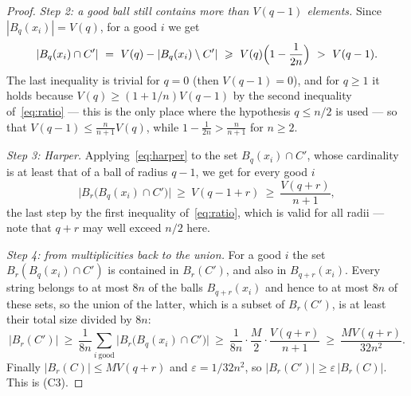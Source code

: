 \documentclass[10pt,a4paper]{amsart}
\newcommand{\eps}{\varepsilon}
\renewcommand{\ge}{\geqslant}
\renewcommand{\le}{\leqslant}
\begin{document}
\begin{proof}
\emph{Step 2: a good ball still contains more than $V(q-1)$ elements.} Since
$|B_q(x_i)|=V(q)$, for a good $i$ we get
\[
  |B_q(x_i)\cap C'|\ =\ V(q)-|B_q(x_i)\setminus C'|\ \ge\
  V(q)\Bigl(1-\frac1{2n}\Bigr)\ >\ V(q-1) .
\]
The last inequality is trivial for $q=0$ (then $V(q-1)=0$), and for $q\ge1$ it
holds because $V(q)\ge(1+1/n)V(q-1)$ by the second inequality
of~\eqref{eq:ratio} --- this is the only place where the hypothesis $q\le n/2$
is used --- so that $V(q-1)\le\frac n{n+1}V(q)$, while
$1-\frac1{2n}>\frac n{n+1}$ for $n\ge2$.

\emph{Step 3: Harper.} Applying~\eqref{eq:harper} to the set
$B_q(x_i)\cap C'$, whose cardinality is at least that of a ball of radius
$q-1$, we get for every good $i$
\[
  \bigl|B_r\bigl(B_q(x_i)\cap C'\bigr)\bigr|\ \ge\ V(q-1+r)\ \ge\
  \frac{V(q+r)}{n+1},
\]
the last step by the first inequality of~\eqref{eq:ratio}, which is valid for
all radii --- note that $q+r$ may well exceed $n/2$ here.

\emph{Step 4: from multiplicities back to the union.} For a good $i$ the set
$B_r(B_q(x_i)\cap C')$ is contained in $B_r(C')$, and also in $B_{q+r}(x_i)$.
Every string belongs to at most $8n$ of the balls $B_{q+r}(x_i)$ and hence to
at most $8n$ of these sets, so the union of the latter, which is a subset of
$B_r(C')$, is at least their total size divided by $8n$:
\[
  |B_r(C')|\ \ge\ \frac1{8n}\sum_{i\ \text{good}}
  \bigl|B_r\bigl(B_q(x_i)\cap C'\bigr)\bigr|\ \ge\
  \frac1{8n}\cdot\frac M2\cdot\frac{V(q+r)}{n+1}\ \ge\
  \frac{MV(q+r)}{32n^2} .
\]
Finally $|B_r(C)|\le MV(q+r)$ and $\eps=1/32n^2$, so
$|B_r(C')|\ge\eps\,|B_r(C)|$. This is (C3). 
\end{proof}
\end{document}
